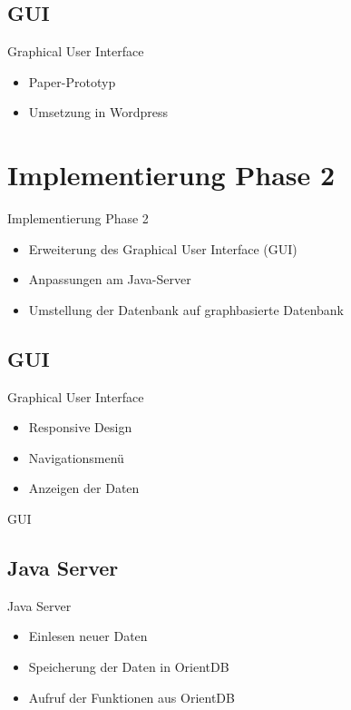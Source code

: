 \documentclass[aspectratio=169]{beamer}
\begin{document}
\subsection{GUI}

\begin{frame}{Graphical User Interface}
  \begin{itemize}
    \item Paper-Prototyp
    \item Umsetzung in Wordpress
  \end{itemize}
\end{frame}

\section{Implementierung Phase 2}

\begin{frame}{Implementierung Phase 2}
  \begin{itemize}
  	\item Erweiterung des Graphical User Interface (GUI)
  	\item Anpassungen am Java-Server
  	\item Umstellung der Datenbank auf graphbasierte Datenbank
  \end{itemize}
\end{frame}

\subsection{GUI}

\begin{frame}{Graphical User Interface}
  \begin{itemize}
  	\item Responsive Design
  	\item Navigationsmenü
  	\item Anzeigen der Daten
  \end{itemize}
\end{frame}

\begin{frame}{GUI}
\end{frame}

\subsection{Java Server}

\begin{frame}{Java Server}
  \begin{itemize}
  	\item Einlesen neuer Daten
  	\item Speicherung der Daten in OrientDB
  	\item Aufruf der Funktionen aus OrientDB
  \end{itemize}
\end{frame}
\end{document}
